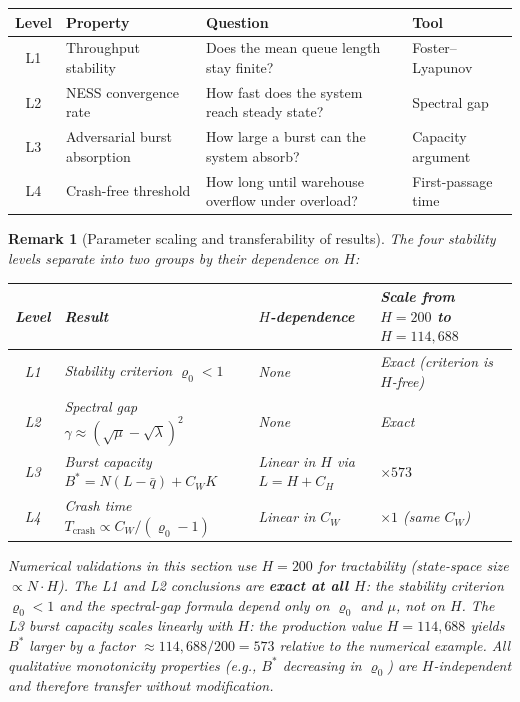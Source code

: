 \documentclass[11pt,a4paper]{article}
\newtheorem{remark}{Remark}[section]
\begin{document}
\smallskip
\begin{center}
\begin{tabularx}{\textwidth}{@{}clXl@{}}
\toprule
Level & Property & Question & Tool \\
\midrule
L1 & Throughput stability & Does the mean queue length stay finite?
   & Foster--Lyapunov~\cite{foster1953,meyn2009} \\
L2 & NESS convergence rate & How fast does the system reach steady state?
   & Spectral gap \\
L3 & Adversarial burst absorption & How large a burst can the system absorb?
   & Capacity argument \\
L4 & Crash-free threshold & How long until warehouse overflow under overload?
   & First-passage time \\
\bottomrule
\end{tabularx}
\end{center}
\smallskip

\begin{remark}[Parameter scaling and transferability of results]
\label{rem:H_scaling}
The four stability levels separate into two groups by their dependence on $H$:

\medskip
\begin{center}
\begin{tabularx}{\textwidth}{@{}clXl@{}}
\toprule
Level & Result & $H$-dependence & Scale from $H{=}200$ to $H{=}114{,}688$ \\
\midrule
L1 & Stability criterion $\varrho_0 < 1$ & None & Exact (criterion is $H$-free) \\
L2 & Spectral gap $\gamma \approx (\sqrt{\mu}-\sqrt{\lambda})^2$ & None & Exact \\
L3 & Burst capacity $B^* = N(L - \bar q) + C_W K$ & Linear in $H$ via $L = H + C_H$ & $\times 573$ \\
L4 & Crash time $T_{\mathrm{crash}} \propto C_W / (\varrho_0 - 1)$ & Linear in $C_W$ & $\times 1$ (same $C_W$) \\
\bottomrule
\end{tabularx}
\end{center}

\medskip
Numerical validations in this section use $H = 200$ for tractability
(state-space size $\propto N \cdot H$).  The L1 and L2 conclusions are
\textbf{exact at all $H$}: the stability criterion $\varrho_0 < 1$ and the
spectral-gap formula depend only on $\varrho_0$ and $\mu$, not on $H$.
The L3 burst capacity scales \emph{linearly} with $H$:
the production value $H = 114{,}688$ yields $B^*$ larger by a factor
$\approx 114{,}688 / 200 = 573$ relative to the numerical example.
All qualitative monotonicity properties (e.g., $B^*$ decreasing in $\varrho_0$)
are $H$-independent and therefore transfer without modification.
\end{remark}
\end{document}
